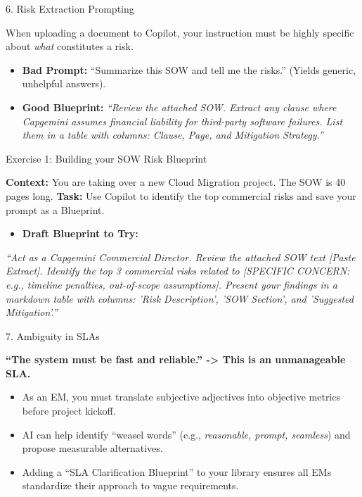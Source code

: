 \documentclass[aspectratio=169]{beamer}
\begin{document}
\begin{frame}{6. Risk Extraction Prompting}


When uploading a document to Copilot, your instruction must be highly specific about \textit{what} constitutes a risk.

\begin{itemize}
  \item \textbf{Bad Prompt:} ``Summarize this SOW and tell me the risks.'' (Yields generic, unhelpful answers).
  \item \textbf{Good Blueprint:} \textit{``Review the attached SOW. Extract any clause where Capgemini assumes financial liability for third-party software failures. List them in a table with columns: Clause, Page, and Mitigation Strategy.''}
\end{itemize}
\end{frame}

\begin{frame}{Exercise 1: Building your SOW Risk Blueprint}


\textbf{Context:} You are taking over a new Cloud Migration project. The SOW is 40 pages long.
\textbf{Task:} Use Copilot to identify the top commercial risks and save your prompt as a Blueprint.

\begin{itemize}
  \item \textbf{Draft Blueprint to Try:}
\end{itemize}
\textit{``Act as a Capgemini Commercial Director. Review the attached SOW text [Paste Extract]. Identify the top 3 commercial risks related to [SPECIFIC CONCERN: e.g., timeline penalties, out-of-scope assumptions]. Present your findings in a markdown table with columns: 'Risk Description', 'SOW Section', and 'Suggested Mitigation'.''}

\end{frame}

\begin{frame}{7. Ambiguity in SLAs}


\textbf{``The system must be fast and reliable.'' -> This is an unmanageable SLA.}

\begin{itemize}
  \item As an EM, you must translate subjective adjectives into objective metrics before project kickoff.
  \item AI can help identify ``weasel words'' (e.g., \textit{reasonable, prompt, seamless}) and propose measurable alternatives.
  \item Adding a ``SLA Clarification Blueprint'' to your library ensures all EMs standardize their approach to vague requirements.
\end{itemize}
\end{frame}
\end{document}
